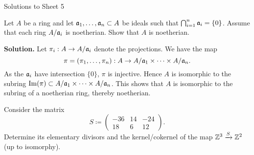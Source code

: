 \documentclass[a4paper,11pt]{article}
\begin{document}
\begin{center}
    \huge{Solutions to Sheet 5}
\end{center}

Let $A$ be a ring and let $\mathfrak{a}_1, \dots, \mathfrak{a}_n \subset A$ be ideals such
that $\bigcap_{i=1}^n \mathfrak{a}_i = \{0\}$. Assume that each ring 
$A / \mathfrak{a}_i$ is noetherian. Show that $A$ is noetherian. 

\textbf{Solution.}
Let $\pi_i : A \to A / \mathfrak{a}_i$ denote the projections. We have the map 
\begin{equation*}
 \pi = (\pi_1, \dots, \pi_n): A \to A/\mathfrak{a}_1 \times \dots \times A/\mathfrak{a}_n.
\end{equation*}
As the $\mathfrak{a}_i$ have intersection $\{0\}$, $\pi$ is injective. Hence $A$ is isomorphic
to the subring $\operatorname{Im}(\pi) \subset A/\mathfrak{a}_1 \times \dots \times A/\mathfrak{a}_n$. This 
shows that $A$ is isomorphic to the subring of a noetherian ring, thereby
noetherian.

Consider the matrix
\begin{equation*}
    S \coloneqq \begin{pmatrix}
        -36 & 14 & -24 \\
        18 & 6 & 12
    \end{pmatrix}.
\end{equation*}
Determine its elementary divisors and the kernel/cokernel of the map
$\mathbb{Z}^3 \xrightarrow{S} \mathbb{Z}^2$ (up to isomorphy).
\end{document}

